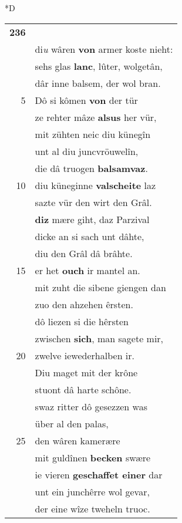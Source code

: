 \documentclass[8pt,a4paper,notitlepage]{article}
\begin{document}
\begin{table}[ht]
\begin{minipage}[t]{0.5\linewidth}
\small
\begin{center}*D
\end{center}
\begin{tabular}{rl}
\textbf{236} & \textit{\begin{large}V\end{large}}orem Grâle kômen lieht,\\ 
 & di\textit{u} wâren \textbf{von} armer koste nieht:\\ 
 & sehs glas \textbf{lanc}, lûter, wolgetân,\\ 
 & dâr inne balsem, der wol bran.\\ 
5 & Dô si kômen \textbf{von} der tür\\ 
 & ze rehter mâze \textbf{alsus} her vür,\\ 
 & mit zühten neic diu künegîn\\ 
 & unt al diu juncvröuwelîn,\\ 
 & die dâ truogen \textbf{balsamvaz}.\\ 
10 & diu küneginne \textbf{valscheite} laz\\ 
 & sazte vür den wirt den Grâl.\\ 
 & \textbf{diz} mære giht, daz Parzival\\ 
 & dicke an si sach unt dâhte,\\ 
 & diu den Grâl dâ brâhte.\\ 
15 & er het \textbf{ouch} ir mantel an.\\ 
 & mit zuht die sibene giengen dan\\ 
 & zuo den ahzehen êrsten.\\ 
 & dô liezen si die hêrsten\\ 
 & zwischen \textbf{sich}, man sagete mir,\\ 
20 & zwelve iewederhalben ir.\\ 
 & Diu maget mit der krône\\ 
 & stuont dâ harte schône.\\ 
 & swaz ritter dô gesezzen was\\ 
 & über al den palas,\\ 
25 & den wâren kamerære\\ 
 & mit guldînen \textbf{becken} swære\\ 
 & ie vieren \textbf{geschaffet einer} dar\\ 
 & unt ein junchêrre wol gevar,\\ 
 & der eine wîze tweheln truoc.\\ 

\end{tabular}
\end{minipage}
\end{table}
\end{document}
